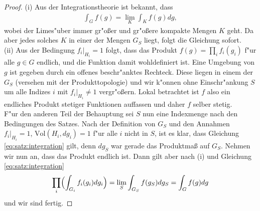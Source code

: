 		\begin{proof}
			(i) Aus der Integrationstheorie ist bekannt, dass
			\begin{align*}
				\int_{G} f(g) = \lim_{K} \int_{K} f(g)dg,
			\end{align*}
			wobei der Limes"uber immer gr"oßer und gr"oßere kompakte Mengen  $K$ geht. Da aber jedes solches $K$ in einer der Mengen $G_S$ liegt, folgt die Gleichung sofort.\\
			
			\noindent(ii) Aus der Bedingung $f_i |_{H_i} = 1$ folgt, dass das Produkt $f(g) = \prod_{i}f_{i}(g_i)$ f"ur alle $g \in G$ endlich, und die Funktion damit wohldefiniert ist. Eine Umgebung von $g$ ist gegeben durch ein offenes beschr"anktes Rechteck. Diese liegen in einem der $G_S$ (versehen mit der Produkttopologie) und wir k"onnen ohne Einschr"ankung $S$ um alle Indizes $i$ mit $f_i|_{H_i}\not= 1$ vergr"oßern.
			Lokal betrachtet ist $f$ also ein endliches Produkt stetiger Funktionen auffassen und daher $f$ selber stetig.\\
			F"ur den anderen Teil der Behauptung sei $S$ nun eine Indexmenge nach den Bedingungen des Satzes. 
			Nach der Definition von $G_S$ und den Annahmen $f_i|_{H_i} = 1$, $\text{Vol}(H_i, dg_i) = 1$ f"ur alle $i$ nicht in $S$, ist es klar, dass Gleichung \ref{eq:satz:integration} gilt, denn $dg_S$ war gerade das Produktmaß auf $G_S$. Nehmen wir nun an, dass das Produkt endlich ist. 
			Dann gilt aber nach (i) und Gleichung \ref{eq:satz:integration}
			\begin{align*}
				\prod_{i}\Bigl(\int_{G_i} f_i (g_i)dg_i\Bigr) = \lim_S \int_{G_S} f(g_S) dg_S = \int_{G} f(g) dg
			\end{align*}
			und wir sind fertig.
		\end{proof}

